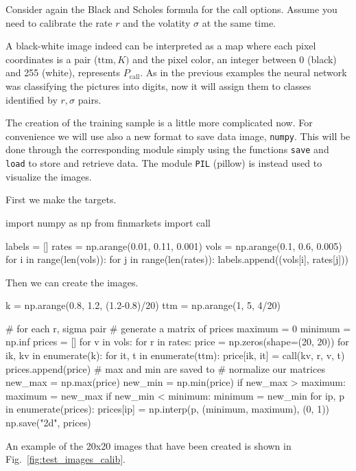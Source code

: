 Consider again the Black and Scholes formula for the call options. Assume you need to calibrate the rate \(r\) and the volatity \(\sigma\) at the same time.%

A black-white image indeed can be interpreted as a map where each pixel coordinates is a pair (\(\mathrm{ttm}, K)\) and the pixel color, an integer between 0 (black) and 255 (white), represents \(P_\textrm{call}\). As in the previous examples the neural network was classifying the pictures into digits, now it will assign them to classes identified by \(r, \sigma\) pairs.

The creation of the training sample is a little more complicated now. For convenience we will use also a new format to save data image, \texttt{numpy}. This will be done through the corresponding module simply using the functions \texttt{save} and \texttt{load} to store and retrieve data. The module \texttt{PIL} (pillow) is instead used to visualize the images.

First we make the targets.

\begin{ipython}
import numpy as np
from finmarkets import call

labels = []
rates = np.arange(0.01, 0.11, 0.001)
vols = np.arange(0.1, 0.6, 0.005)
for i in range(len(vols)):
    for j in range(len(rates)):
        labels.append((vols[i], rates[j]))
\end{ipython}
\noindent
Then we can create the images.

\begin{ipython}
k = np.arange(0.8, 1.2, (1.2-0.8)/20)
ttm = np.arange(1, 5, 4/20)

# for each r, sigma pair
# generate a matrix of prices
maximum = 0
minimum = np.inf
prices = []
for v in vols:
    for r in rates:
        price = np.zeros(shape=(20, 20))
        for ik, kv in enumerate(k):
            for it, t in enumerate(ttm):
                price[ik, it] = call(kv, r, v, t)
                prices.append(price)
                # max and min are saved to
                # normalize our matrices
                new_max = np.max(price)
                new_min = np.min(price)
                if new_max > maximum:
                    maximum = new_max
                if new_min < minimum:
                    minimum = new_min
for ip, p in enumerate(prices):
    prices[ip] = np.interp(p, (minimum, maximum), (0, 1))
np.save("2d", prices)
\end{ipython}
\noindent
An example of the 20x20 images that have been created is shown in Fig.~\ref{fig:test_images_calib}.

